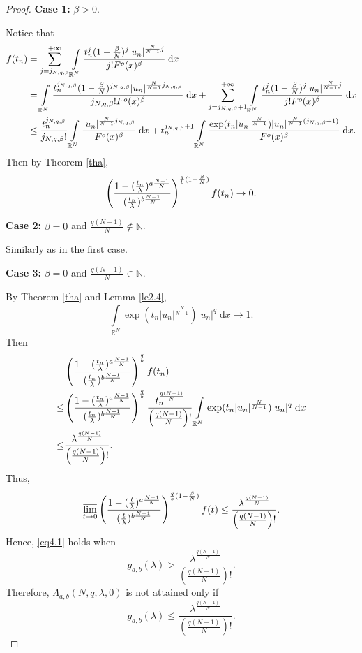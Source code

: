 \documentclass[11pt]{article}
\theoremstyle{plain}
\numberwithin{equation}{section}
\newcommand{\R}{\mathbb{R}}
\newcommand{\N}{\mathbb{N}}
\begin{document}
\begin{proof}
{\bfseries Case 1:} $\beta>0$.

Notice that
\begin{align}
    f(t_{n})&=\sum\limits_{j=j_{N,q,\beta}}^{+\infty}\int\limits_{\R^{N}}\frac{t_{n}^{j}(1-\frac{\beta}{N})^{j}\lvert u_{n}\rvert^{\frac{N}{N-1}j}}{j!F^{o}(x)^{\beta}}\;\mathrm{d}x\notag\\
    &=\int\limits_{\R^{N}}\frac{t_{n}^{j_{N,q,\beta}}(1-\frac{\beta}{N})^{j_{N,q,\beta}}\lvert u_{n}\rvert^{\frac{N}{N-1}j_{N,q,\beta}}}{j_{N,q,\beta}!F^{o}(x)^{\beta}}\;\mathrm{d}x+\sum\limits_{j=j_{N,q,\beta}+1}^{+\infty}\int\limits_{\R^{N}}\frac{t_{n}^{j}(1-\frac{\beta}{N})^{j}\lvert u_{n}\rvert^{\frac{N}{N-1}j}}{j!F^{o}(x)^{\beta}}\;\mathrm{d}x\notag\\
    &\leq\frac{t_{n}^{j_{N,q,\beta}}}{j_{N,q,\beta}!}\int\limits_{\R^{N}}\frac{\lvert u_{n}\rvert^{\frac{N}{N-1}j_{N,q,\beta}}}{F^{o}(x)^{\beta}}\;\mathrm{d}x+t_{n}^{j_{N,q,\beta}+1}\int\limits_{\R^{N}}\frac{\exp(t_{n}\lvert u_{n}\rvert^{\frac{N}{N-1}})\lvert u_{n}\rvert^{\frac{N}{N-1}(j_{N,q,\beta}+1)}}{F^{o}(x)^{\beta}}\;\mathrm{d}x.\notag
\end{align}
Then by Theorem \ref{tha},
\begin{align}
    \left(\frac{1-(\frac{t_{n}}{\lambda})^{a\frac{N-1}{N}}}{(\frac{t_{n}}{\lambda})^{b\frac{N-1}{N}}}\right)^{\frac{q}{b}(1-\frac{\beta}{N})}f(t_{n})\rightarrow0.\notag
\end{align}

{\bfseries Case 2:} $\beta=0$ and $\frac{q(N-1)}{N}\not\in\N$.

Similarly as in the first case.

{\bfseries Case 3:} $\beta=0$ and $\frac{q(N-1)}{N}\in\N$.

By Theorem \ref{tha} and Lemma \ref{le2.4},
$$
\int\limits_{\R^{N}}\exp(t_{n}\lvert u_{n}\rvert^{\frac{N}{N-1}})\lvert u_{n}\rvert^{q}\;\mathrm{d}x\rightarrow1.
$$
Then
\begin{align}
    &\left(\frac{1-(\frac{t_{n}}{\lambda})^{a\frac{N-1}{N}}}{(\frac{t_{n}}{\lambda})^{b\frac{N-1}{N}}}\right)^{\frac{q}{b}}f(t_{n})\notag\\
    \leq&\left(\frac{1-(\frac{t_{n}}{\lambda})^{a\frac{N-1}{N}}}{(\frac{t_{n}}{\lambda})^{b\frac{N-1}{N}}}\right)^{\frac{q}{b}}\frac{t_{n}^{\frac{q(N-1)}{N}}}{\left(\frac{q(N-1)}{N}\right)!}\int\limits_{\R^{N}}\exp(t_{n}\lvert u_{n}\rvert^{\frac{N}{N-1}})\lvert u_{n}\rvert^{q}\;\mathrm{d}x\notag\\
    \leq&\frac{\lambda^{\frac{q(N-1)}{N}}}{\left(\frac{q(N-1)}{N}\right)!}.\notag
\end{align}
Thus,
$$
\varlimsup\limits_{t\rightarrow0}\left(\frac{1-(\frac{t}{\lambda})^{a\frac{N-1}{N}}}{(\frac{t}{\lambda})^{b\frac{N-1}{N}}}\right)^{\frac{q}{b}(1-\frac{\beta}{N})}f(t)\leq\frac{\lambda^{\frac{q(N-1)}{N}}}{\left(\frac{q(N-1)}{N}\right)!}.
$$
Hence, \eqref{eq4.1} holds when
$$
g_{a,b}(\lambda)>\frac{\lambda^{\frac{q(N-1)}{N}}}{\left(\frac{q(N-1)}{N}\right)!}.
$$
Therefore, $\Lambda_{a,b}(N,q,\lambda, 0)$ is not attained only if
$$
g_{a,b}(\lambda)\leq\frac{\lambda^{\frac{q(N-1)}{N}}}{\left(\frac{q(N-1)}{N}\right)!}.
$$
\end{proof}
\end{document}
